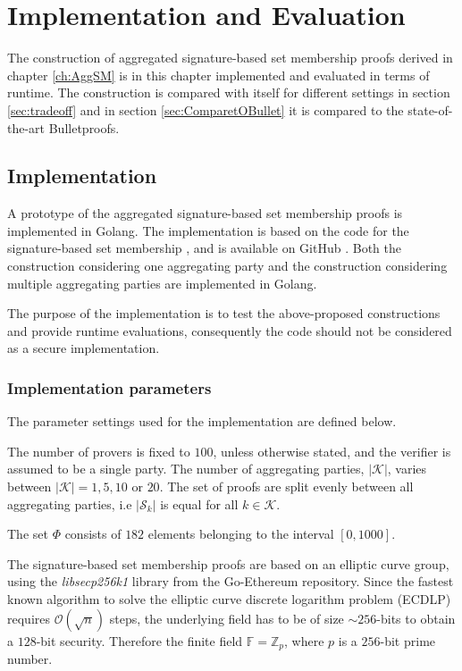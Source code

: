 \chapter{Implementation and Evaluation}
\label{ch:results}
The construction of aggregated signature-based set membership proofs derived in chapter \ref{ch:AggSM} is in this chapter implemented and evaluated in terms of runtime. The construction is compared with itself for different settings in section \ref{sec:tradeoff} and in section \ref{sec:ComparetOBullet} it is compared to the state-of-the-art Bulletproofs. 
\section{Implementation}
A prototype of the aggregated signature-based set membership proofs is implemented in Golang. The implementation is based on the code for the signature-based set membership \cite{Git:RP}, and is available on GitHub \cite{Git:mycode}. Both the construction considering one aggregating party and the construction considering multiple aggregating parties are implemented in Golang. 


The purpose of the implementation is  to test the above-proposed constructions and provide runtime evaluations, consequently the code should not  be considered as a secure implementation.
\subsection*{Implementation parameters}
The parameter settings used for the implementation are defined below. 

The number of provers is fixed to $100$, unless otherwise stated, and the verifier is assumed to be a single party. The number of aggregating parties, $|\mathcal{K}|$, varies between $|\mathcal{K}| = 1,5,10$ or $20$. The set of proofs are split evenly between all aggregating parties, i.e $|\mathcal{S}_k|$ is equal for all $k\in\mathcal{K}$.

The set $\Phi$ consists of $182$ elements belonging to  the interval $[0,1000]$.  

The signature-based set membership proofs are based on an elliptic curve group, using the \textit{libsecp256k1} library from the Go-Ethereum repository. Since the fastest known algorithm to solve the elliptic curve discrete logarithm problem (ECDLP) requires $\mathcal{O}(\sqrt{n})$ steps, the underlying field has to be of size $\sim 256$-bits to obtain a $128$-bit security. Therefore the finite field $\mathds{F}= \mathds{Z}_p$, where $p$ is a $256$-bit prime number. 
 
